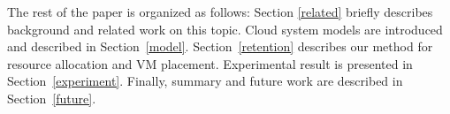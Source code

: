 The rest of the paper is organized as follows: Section \ref{related} briefly describes background and related work on this topic. Cloud system models are introduced and described in Section~\ref{model}. Section~\ref{retention} describes our method for resource allocation and VM placement. Experimental result is presented in Section~\ref{experiment}. Finally, summary and future work are described in Section~\ref{future}.



